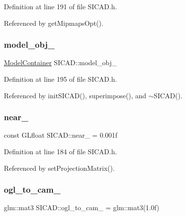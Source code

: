 Definition at line 191 of file S\+I\+C\+A\+D.\+h.



Referenced by get\+Mipmaps\+Opt().

\mbox{\label{classSICAD_a05fea2b5b027a3b7f37ef9ea4ecd64f0}} 
\subsubsection{\texorpdfstring{model\+\_\+obj\+\_\+}{model\_obj\_}}
{\footnotesize\ttfamily \mbox{\hyperlink{classSICAD_aca3c9693d298f2e8dc171194c6a7507c}{Model\+Container}} S\+I\+C\+A\+D\+::model\+\_\+obj\+\_\+\hspace{0.3cm}{\ttfamily [private]}}



Definition at line 195 of file S\+I\+C\+A\+D.\+h.



Referenced by init\+S\+I\+C\+A\+D(), superimpose(), and $\sim$\+S\+I\+C\+A\+D().

\mbox{\label{classSICAD_a690437655965101bad97d32e98015dd5}} 
\subsubsection{\texorpdfstring{near\+\_\+}{near\_}}
{\footnotesize\ttfamily const G\+Lfloat S\+I\+C\+A\+D\+::near\+\_\+ = 0.\+001f\hspace{0.3cm}{\ttfamily [private]}}



Definition at line 184 of file S\+I\+C\+A\+D.\+h.



Referenced by set\+Projection\+Matrix().

\mbox{\label{classSICAD_a95af2758122e6420369516fd13fd03cc}} 
\subsubsection{\texorpdfstring{ogl\+\_\+to\+\_\+cam\+\_\+}{ogl\_to\_cam\_}}
{\footnotesize\ttfamily glm\+::mat3 S\+I\+C\+A\+D\+::ogl\+\_\+to\+\_\+cam\+\_\+ = glm\+::mat3(1.\+0f)\hspace{0.3cm}{\ttfamily [private]}}



